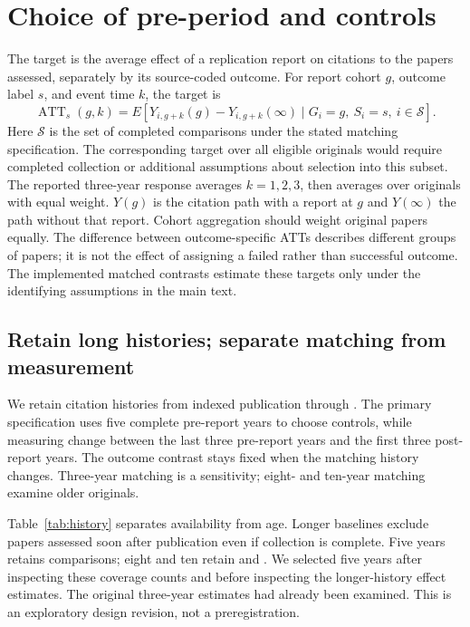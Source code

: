 \section{Choice of pre-period and controls}
\label{sec:design}
The target is the average effect of a replication report on citations to the papers assessed, separately by its source-coded outcome. For report cohort $g$, outcome label $s$, and event time $k$, the target is
\[
 \operatorname{ATT}_{s}(g,k)
 = E\!\left[Y_{i,g+k}(g)-Y_{i,g+k}(\infty)
       \mid G_i=g,\ S_i=s,\ i\in\mathcal{S}\right].
\]
Here $\mathcal{S}$ is the set of completed comparisons under the stated matching specification. The corresponding target over all eligible originals would require completed collection or additional assumptions about selection into this subset. The reported three-year response averages $k=1,2,3$, then averages over originals with equal weight. $Y(g)$ is the citation path with a report at $g$ and $Y(\infty)$ the path without that report. Cohort aggregation should weight original papers equally. The difference between outcome-specific ATTs describes different groups of papers; it is not the effect of assigning a failed rather than successful outcome. The implemented matched contrasts estimate these targets only under the identifying assumptions in the main text.

\subsection{Retain long histories; separate matching from measurement}
We retain citation histories from indexed publication through \CitationsThrough{}. The primary specification uses five complete pre-report years to choose controls, while measuring change between the last three pre-report years and the first three post-report years. The outcome contrast stays fixed when the matching history changes. Three-year matching is a sensitivity; eight- and ten-year matching examine older originals.

Table~\ref{tab:history} separates availability from age. Longer baselines exclude papers assessed soon after publication even if collection is complete. Five years retains \FiveHistoryN{} comparisons; eight and ten retain \EightHistoryN{} and \TenHistoryN{}. We selected five years after inspecting these coverage counts and before inspecting the longer-history effect estimates. The original three-year estimates had already been examined. This is an exploratory design revision, not a preregistration.

